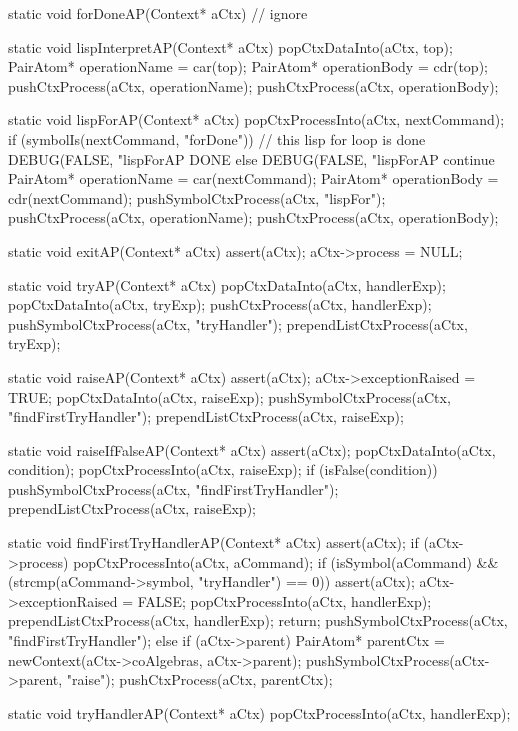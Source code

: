 static void forDoneAP(Context* aCtx) {
  // ignore
}

static void lispInterpretAP(Context* aCtx) {
  popCtxDataInto(aCtx, top);
  PairAtom* operationName = car(top);
  PairAtom* operationBody = cdr(top);
  pushCtxProcess(aCtx, operationName);
  pushCtxProcess(aCtx, operationBody);
}

static void lispForAP(Context* aCtx) {
  popCtxProcessInto(aCtx, nextCommand);
  if (symbolIs(nextCommand, "forDone")) {
    // this lisp for loop is done
    DEBUG(FALSE, "lispForAP DONE%
  } else {
    DEBUG(FALSE, "lispForAP continue%
    PairAtom* operationName = car(nextCommand);
    PairAtom* operationBody = cdr(nextCommand);
    pushSymbolCtxProcess(aCtx, "lispFor");
    pushCtxProcess(aCtx, operationName);
    pushCtxProcess(aCtx, operationBody);
  }
}

static void exitAP(Context* aCtx) {
  assert(aCtx);
  aCtx->process = NULL;
}

static void tryAP(Context* aCtx) {
  popCtxDataInto(aCtx, handlerExp);
  popCtxDataInto(aCtx, tryExp);
  pushCtxProcess(aCtx, handlerExp);
  pushSymbolCtxProcess(aCtx, "tryHandler");
  prependListCtxProcess(aCtx, tryExp);
}

static void raiseAP(Context* aCtx) {
  assert(aCtx);
  aCtx->exceptionRaised = TRUE;
  popCtxDataInto(aCtx, raiseExp);
  pushSymbolCtxProcess(aCtx, "findFirstTryHandler");
  prependListCtxProcess(aCtx, raiseExp);
}

static void raiseIfFalseAP(Context* aCtx) {
  assert(aCtx);
  popCtxDataInto(aCtx, condition);
  popCtxProcessInto(aCtx, raiseExp);
  if (isFalse(condition)) {
    pushSymbolCtxProcess(aCtx, "findFirstTryHandler");
    prependListCtxProcess(aCtx, raiseExp);
  }
}

static void findFirstTryHandlerAP(Context* aCtx) {
  assert(aCtx);
  if (aCtx->process) {
    popCtxProcessInto(aCtx, aCommand);
    if (isSymbol(aCommand) && (strcmp(aCommand->symbol, "tryHandler") == 0)) {
      assert(aCtx);
      aCtx->exceptionRaised = FALSE;
      popCtxProcessInto(aCtx, handlerExp);
      prependListCtxProcess(aCtx, handlerExp);
      return;
    }
    pushSymbolCtxProcess(aCtx, "findFirstTryHandler");
  } else {
    if (aCtx->parent) {
      PairAtom* parentCtx = newContext(aCtx->coAlgebras, aCtx->parent);
      pushSymbolCtxProcess(aCtx->parent, "raise");
      pushCtxProcess(aCtx, parentCtx);
    }
  }
}

static void tryHandlerAP(Context* aCtx) {
  popCtxProcessInto(aCtx, handlerExp);
}

